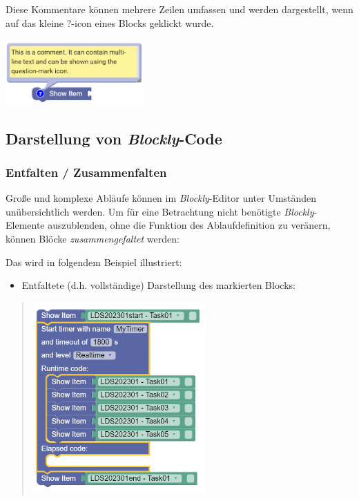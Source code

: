 \documentclass[
  letterpaper,
  DIV=11]{scrreprt}
\providecommand{\tightlist}{%
  \setlength{\itemsep}{0pt}\setlength{\parskip}{0pt}}\usepackage{longtable,booktabs,array}
\begin{document}
\begin{tcolorbox}
Diese Kommentare können mehrere Zeilen umfassen und werden dargestellt,
wenn auf das kleine ?-icon eines Blocks geklickt wurde.

\includegraphics[width=2.08333in,height=\textheight]{img/screenshot-routing-comment-example-ENG.png}

\hypertarget{darstellung-von-blockly-code-1}{%
\subsection{\texorpdfstring{Darstellung von
\emph{Blockly}-Code}{Darstellung von Blockly-Code}}\label{darstellung-von-blockly-code-1}}

\hypertarget{entfalten-zusammenfalten-1}{%
\subsubsection{Entfalten /
Zusammenfalten}\label{entfalten-zusammenfalten-1}}

Große und komplexe Abläufe können im \emph{Blockly}-Editor unter
Umständen unübersichtlich werden. Um für eine Betrachtung nicht
benötigte \emph{Blockly}-Elemente auszublenden, ohne die Funktion des
Ablaufdefinition zu veränern, können Blöcke \emph{zusammengefaltet}
werden:

Das wird in folgendem Beispiel illustriert:

\begin{itemize}
\tightlist
\item
  Entfaltete (d.h. vollständige) Darstellung des markierten Blocks:
\end{itemize}

\begin{quote}
\includegraphics[width=2.60417in,height=\textheight]{img/screenshot-blockly-folding-unfolding-example-01-DEU.png}
\end{quote}


\end{tcolorbox}
\end{document}
